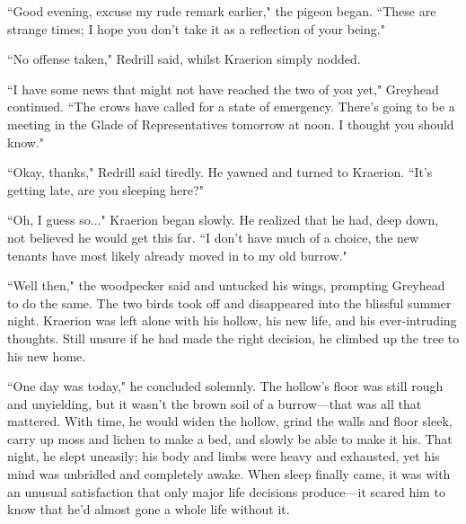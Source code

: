 ``Good evening, excuse my rude remark earlier," the pigeon began.
``These are strange times; I hope you don't take it as a reflection of your being."

``No offense taken," Redrill said, whilst Kraerion simply nodded.

``I have some news that might not have reached the two of you yet," Greyhead continued.
``The crows have called for a state of emergency.
There's going to be a meeting in the Glade of Representatives tomorrow at noon.
I thought you should know."

``Okay, thanks," Redrill said tiredly. He yawned and turned to Kraerion.
``It's getting late, are you sleeping here?"

``Oh, I guess so..." Kraerion began slowly.
He realized that he had, deep down, not believed he would get this far.
``I don't have much of a choice, the new tenants have most likely already moved in to my old burrow."

``Well then," the woodpecker said and untucked his wings, prompting Greyhead to do the same.
The two birds took off and disappeared into the blissful summer night.
Kraerion was left alone with his hollow, his new life, and his ever-intruding thoughts.
Still unsure if he had made the right decision, he climbed up the tree to his new home.

``One day was today," he concluded solemnly.
The hollow's floor was still rough and unyielding, but it wasn't the brown soil of a burrow---that was all that mattered.
With time, he would widen the hollow, grind the walls and floor sleek, carry up moss and lichen to make a bed, and slowly be able to make it his.
That night, he slept uneasily; his body and limbs were heavy and exhausted, yet his mind was unbridled and completely awake.
When sleep finally came, it was with an unusual satisfaction that only major life decisions produce---it scared him to know that he'd almost gone a whole life without it.
\newpage
\setcounter{page}{15}



